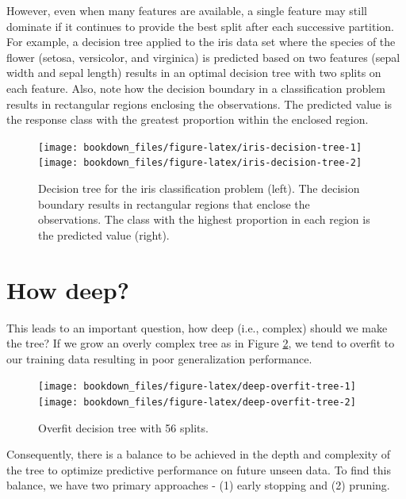 \documentclass[]{krantz}
\begin{document}
However, even when many features are available, a single feature may still dominate if it continues to provide the best split after each successive partition. For example, a decision tree applied to the iris data set \citep{fisher1936use} where the species of the flower (setosa, versicolor, and virginica) is predicted based on two features (sepal width and sepal length) results in an optimal decision tree with two splits on each feature. Also, note how the decision boundary in a classification problem results in rectangular regions enclosing the observations. The predicted value is the response class with the greatest proportion within the enclosed region.

\begin{figure}

{\centering \texttt{[image: bookdown\_files/figure-latex/iris-decision-tree-1]} \texttt{[image: bookdown\_files/figure-latex/iris-decision-tree-2]} 

}

\caption{Decision tree for the iris classification problem (left). The decision boundary results in rectangular regions that enclose the observations.  The class with the highest proportion in each region is the predicted value (right).}\label{fig:iris-decision-tree}
\end{figure}

\hypertarget{how-deep}{%
\section{How deep?}\label{how-deep}}

This leads to an important question, how deep (i.e., complex) should we make the tree? If we grow an overly complex tree as in Figure \ref{fig:deep-overfit-tree}, we tend to overfit to our training data resulting in poor generalization performance.

\begin{figure}

{\centering \texttt{[image: bookdown\_files/figure-latex/deep-overfit-tree-1]} \texttt{[image: bookdown\_files/figure-latex/deep-overfit-tree-2]} 

}

\caption{Overfit decision tree with 56 splits.}\label{fig:deep-overfit-tree}
\end{figure}

Consequently, there is a balance to be achieved in the depth and complexity of the tree to optimize predictive performance on future unseen data. To find this balance, we have two primary approaches - (1) early stopping and (2) pruning.
\end{document}
